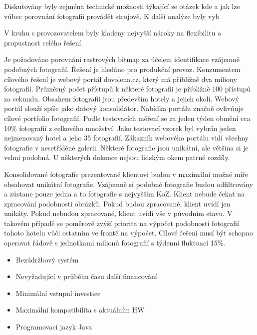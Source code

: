 Diskutovány byly zejména technické možnosti týkající se otázek kde a jak lze vůbec porovnání fotografií provádět strojově. K další analýze byly vyb

V kruhu s provozovatelem byly kladeny nejvyšší nároky na flexibilitu a propustnost celého řešení.


Je požadováno porovnání rastrových bitmap za účelem identifikace vzájemně podobných fotografií. Řešení je hledáno pro produkční provoz. Konzumentem cílového řešení je webový portál dovolena.cz, který má přibližně dva miliony fotografií. Průměrný počet přístupů k některé fotografii je přibližně 100 přístupů za sekundu. Obsahem fotografií jsou především hotely a jejich okolí. Webový portál slouží spíše jako datový konsolidátor. Nabídka portálu značně ovlivňuje cílové portfolio fotografií. Podle testovacích měření se za jeden týden obmění cca 10\% fotografií z celkového množství. Jako testovací vzorek byl vybrán jeden nejmenovaný hotel a jeho 35 fotografií. Zákazník webového portálu vidí všechny fotografie v nesetříděné galerii. Některé fotografie jsou unikátní, ale většina si je velmi podobná. U některých dokonce nejsou lidským okem patrné rozdíly.

Konsolidované fotografie prezentované klientovi budou v maximální možné míře obsahovat unikátní fotografie. Vzájemně si podobné fotografie budou odfiltrovány a zůstane pouze jedna a to fotografie s nejvyšším KoZ. Klient nebude čekat na zpracování podobnosti obrázků. Pokud budou zpracované, klient uvidí jen unikáty. Pokud nebudou zpracované, klient uvidí vše v původním stavu. V takovém případě se poměrově zvýší priorita na výpočet podobnosti fotografií tohoto hotelu vůči ostatním ve frontě na výpočet. Cílové řešení musí být schopno operovat řádově s jednotkami milionů fotografií s týdenní fluktuací 15\%.

\begin{itemize}
	\setlength{\parskip}{0pt}
	\setlength{\itemsep}{0pt}
	\item {Bezúdržbový systém}
	\item {Nevyžadující v průběhu času další financování}
	\item {Minimální vstupní investice}
	\item {Maximální kompatibilita s aktuálním HW}
	\item {Programovací jazyk Java~\cite{java}}
\end{itemize}

